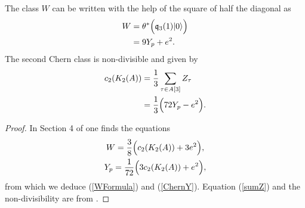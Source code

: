 \begin{proposition}
The class $W$ can be written with the help of the square of half the diagonal as
\begin{align} 
W &= \theta^*\Big( \mathfrak{q}_3(1)|0\rangle \Big) \\
\label{WFormula}
&= 9 Y_p + e^2.
\end{align}
The second Chern class is non-divisible and given by 
\begin{align}
\label{sumZ}
c_2(K_{ 2 }( A )) &= \frac{1}{3}\sum_{\tau\in A[3] } Z_\tau \\
\label{ChernY}
&= \frac{1}{3} \Big(72Y_p-e^2 \Big). 
\end{align}
\end{proposition}
\begin{proof} 
In Section 4 of \cite{Hassett} one finds the equations
\begin{gather}
W = \frac{3}{8}\Big(c_2(K_{ 2 }( A )) + 3e^2\Big),\label{WW} \\
Y_p = \frac{1}{72}\Big(3c_2(K_{ 2 }( A )) + e^2\Big),
\end{gather}
from which we deduce (\ref{WFormula}) and (\ref{ChernY}).
Equation (\ref{sumZ}) and the non-divisibility are from \cite[Proposition 5.1]{Hassett}.
\end{proof}
